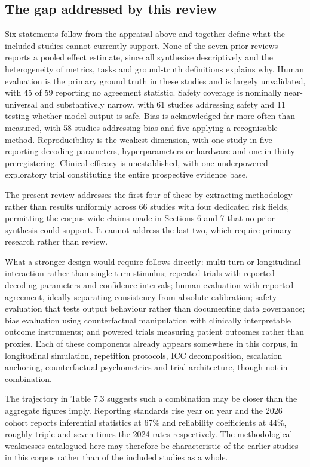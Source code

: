 \documentclass[11pt]{article}
\begin{document}
	\subsection{The gap addressed by this review}
	
	Six statements follow from the appraisal above and together define what the included studies cannot currently support. None of the seven prior reviews reports a pooled effect estimate, since all synthesise descriptively and the heterogeneity of metrics, tasks and ground-truth definitions explains why. Human evaluation is the primary ground truth in these studies and is largely unvalidated, with 45 of 59 reporting no agreement statistic. Safety coverage is nominally near-universal and substantively narrow, with 61 studies addressing safety and 11 testing whether model output is safe. Bias is acknowledged far more often than measured, with 58 studies addressing bias and five applying a recognisable method. Reproducibility is the weakest dimension, with one study in five reporting decoding parameters, hyperparameters or hardware and one in thirty preregistering. Clinical efficacy is unestablished, with one underpowered exploratory trial constituting the entire prospective evidence base.
	
	The present review addresses the first four of these by extracting methodology rather than results uniformly across 66 studies with four dedicated risk fields, permitting the corpus-wide claims made in Sections 6 and 7 that no prior synthesis could support. It cannot address the last two, which require primary research rather than review.
	
	What a stronger design would require follows directly: multi-turn or longitudinal interaction rather than single-turn stimulus; repeated trials with reported decoding parameters and confidence intervals; human evaluation with reported agreement, ideally separating consistency from absolute calibration; safety evaluation that tests output behaviour rather than documenting data governance; bias evaluation using counterfactual manipulation with clinically interpretable outcome instruments; and powered trials measuring patient outcomes rather than proxies. Each of these components already appears somewhere in this corpus, in longitudinal simulation, repetition protocols, ICC decomposition, escalation anchoring, counterfactual psychometrics and trial architecture, though not in combination.
	
	The trajectory in Table 7.3 suggests such a combination may be closer than the aggregate figures imply. Reporting standards rise year on year and the 2026 cohort reports inferential statistics at 67\% and reliability coefficients at 44\%, roughly triple and seven times the 2024 rates respectively. The methodological weaknesses catalogued here may therefore be characteristic of the earlier studies in this corpus rather than of the included studies as a whole.
	
\end{document}
